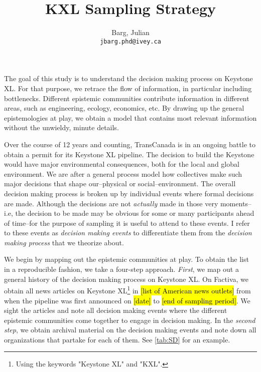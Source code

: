 \documentclass{article}
\title{KXL Sampling Strategy}
\author{
	Barg, Julian\\
	\texttt{jbarg.phd@ivey.ca}
}
\begin{document}
	\maketitle

	\newpage

	The goal of this study is to understand the decision making process on Keystone XL. For that purpose, we retrace the flow of information, in particular including bottlenecks. Different epistemic communities contribute information in different areas, such as engineering, ecology, economics, etc. By drawing up the general epistemologies at play, we obtain a model that contains most relevant information without the unwieldy, minute details.

	Over the course of 12 years and counting, TransCanada is in an ongoing battle to obtain a permit for its Keystone XL pipeline. The decision to build the Keystone would have major environmental consequences, both for the local and global environment. We are after a general process model how collectives make such major decisions that shape our--physical or social--environment. The overall decision making process is broken up by individual events where formal decisions are made. Although the decisions are not \textit{actually} made in those very moments--i.e, the decision to be made may be obvious for some or many participants ahead of time--for the purpose of sampling it is useful to attend to these events. I refer to these events as \textit{decision making events} to differentiate them from the \textit{decision making process} that we theorize about.

	We begin by mapping out the epistemic communities at play. To obtain the list in a reproducible fashion, we take a four-step approach. \textit{First}, we map out a general history of the decision making process on Keystone XL. On Factiva, we obtain all news articles on Keystone XL\footnote{Using the keywords "Keystone XL" and "KXL".} in \hl{[list of American news outlets]} from when the pipeline was first announced on \hl{[date]} to \hl{[end of sampling period]}. We sight the articles and note all decision making events where the different epistemic communities come together to engage in decision making. In the \textit{second step}, we obtain archival material on the decision making events and note down all organizations that partake for each of them. See \autoref{tab:SD} for an example.
\end{document}

